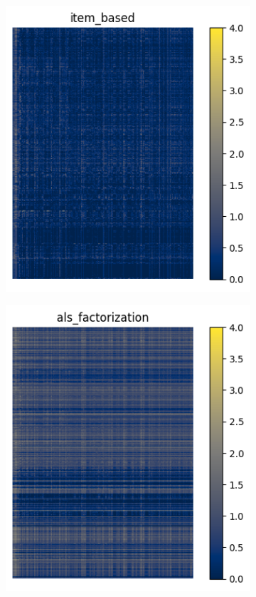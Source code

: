 \documentclass[sigconf]{acmart}
\begin{document}
\begin{figure}[!htb]
\begin{subfigure}{0.2\textwidth}
	\end{subfigure}
	\begin{subfigure}{0.2\textwidth}
		\centering
		\includegraphics[scale=0.4]{matrix_item_based.png}
	\end{subfigure}
	\hfill
	\begin{subfigure}{0.2\textwidth}
		\centering
		\includegraphics[scale=0.4]{matrix_als_factorization.png}
	\end{subfigure}
	\begin{subfigure}{0.2\textwidth}
		\centering

\end{subfigure}
\end{figure}
\end{document}
